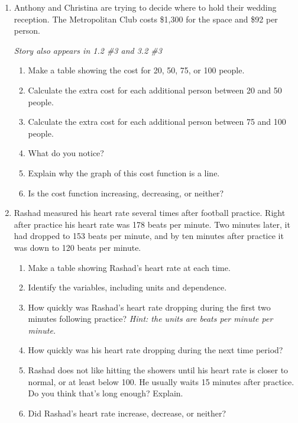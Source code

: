 \begin{enumerate}
\newpage %

 \item Anthony and Christina are trying to decide where to hold their wedding reception.  The Metropolitan Club costs \$1,300 for the space and \$92 per person.  
 
 \hfill \emph{Story also appears in 1.2 \#3 and 3.2 \#3} 
\begin{enumerate}
\item Make a table showing the cost for 20, 50, 75, or 100 people. %
\vfill \vfill
\item Calculate the extra cost for each additional person between 20 and 50 people. \vfill
\item Calculate the extra cost  for each additional person between 75 and 100 people. \vfill
\item What do you notice? \vfill
\item Explain why the graph of this cost function is a line. \vfill
\item Is the cost function increasing, decreasing, or neither? \vfill
\end{enumerate}  

\newpage %

\item Rashad measured his heart rate several times after football practice.  Right after practice his heart rate was 178 beats per minute.  Two minutes later, it had dropped to 153 beats per minute, and by ten minutes after practice it was down to 120 beats per minute. 
\begin{enumerate}
\item Make a table showing Rashad's heart rate at each time. \vfill
\item Identify the variables, including units and dependence. \vfill
\item How quickly was Rashad's heart rate dropping during the first two minutes following practice?  \emph{Hint: the units are beats per minute per minute.} \vfill
\item How quickly was his heart rate dropping during the next time period? \vfill
\item Rashad does not like hitting the showers until  his heart rate is closer to normal, or at least below 100.  He usually waits 15 minutes after practice.  Do you think that's long enough?  Explain. \vfill
 \item Did Rashad's heart rate increase, decrease, or neither? \vfill
\end{enumerate} 
\newpage %


\end{enumerate}
